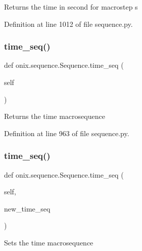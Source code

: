\begin{DoxyVerb}Returns the time in second for macrostep s
\end{DoxyVerb}
 

Definition at line 1012 of file sequence.\+py.

\mbox{\label{classonix_1_1sequence_1_1Sequence_ab7a35d62cc3f5afd8a71a429d46c2732}} 
\subsubsection{\texorpdfstring{time\+\_\+seq()}{time\_seq()}\hspace{0.1cm}{\footnotesize\ttfamily [1/2]}}
{\footnotesize\ttfamily def onix.\+sequence.\+Sequence.\+time\+\_\+seq (\begin{DoxyParamCaption}\item[{}]{self }\end{DoxyParamCaption})}

\begin{DoxyVerb}Returns the time macrosequence
\end{DoxyVerb}
 

Definition at line 963 of file sequence.\+py.

\mbox{\label{classonix_1_1sequence_1_1Sequence_a7e33e7f75467dc9361a0f57003000faa}} 
\subsubsection{\texorpdfstring{time\+\_\+seq()}{time\_seq()}\hspace{0.1cm}{\footnotesize\ttfamily [2/2]}}
{\footnotesize\ttfamily def onix.\+sequence.\+Sequence.\+time\+\_\+seq (\begin{DoxyParamCaption}\item[{}]{self,  }\item[{}]{new\+\_\+time\+\_\+seq }\end{DoxyParamCaption})}

\begin{DoxyVerb}Sets the time macrosequence
\end{DoxyVerb}
 

